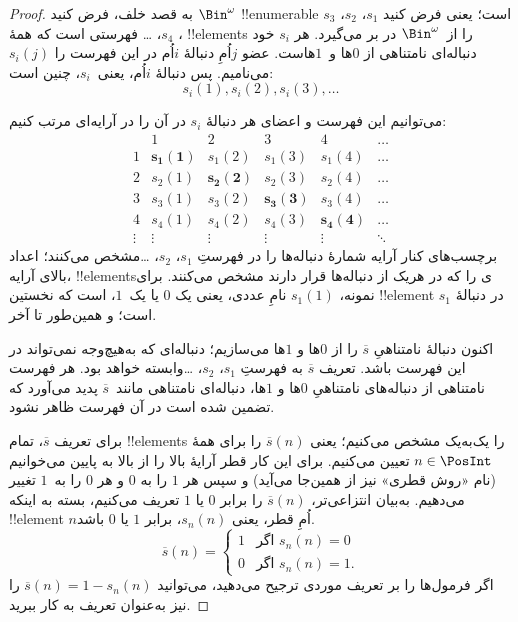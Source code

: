 \documentclass[../../../include/open-logic-section]{subfiles}
\begin{document}
\begin{proof}
به قصد خلف، فرض کنید $\Bin^\omega$ !!{enumerable} است؛ یعنی فرض کنید
$s_{1}$، $s_{2}$، $s_{3}$، $s_{4}$، \dots{} فهرستی است که همهٔ
!!{element}s را از~$\Bin^\omega$ در بر می‌گیرد. هر $s_i$ خود دنباله‌ای
نامتناهی از $0$ها و~$1$هاست. عضو $j$اُمِ دنبالهٔ $i$اُم در این فهرست
را $s_i(j)$ می‌نامیم. پس دنبالهٔ $i$اُم، یعنی~$s_i$، چنین است:
\[
s_i(1), s_i(2), s_i(3), \dots
\]

می‌توانیم این فهرست و اعضای هر دنبالهٔ $s_i$ در آن را در آرایه‌ای
مرتب کنیم:
\[
\begin{array}{c|c|c|c|c|c}
& 1 & 2 & 3 & 4 & \dots \\\hline
1 & \mathbf{s_{1}(1)} & s_{1}(2) & s_{1}(3) & s_1(4) & \dots \\\hline
2 & s_{2}(1)& \mathbf{s_{2}(2)} & s_2(3) & s_2(4) & \dots \\\hline
3 & s_{3}(1)& s_{3}(2) & \mathbf{s_3(3)} & s_3(4) & \dots \\\hline
4 & s_{4}(1)& s_{4}(2) & s_4(3) & \mathbf{s_4(4)} & \dots \\\hline
\vdots & \vdots & \vdots & \vdots & \vdots & \mathbf{\ddots}
\end{array}
\]
برچسب‌های کنار آرایه شمارهٔ دنباله‌ها را در فهرستِ $s_1$، $s_2$،
\dots مشخص می‌کنند؛ اعداد بالای آرایه، !!{element}sی را که در هریک از
دنباله‌ها قرار دارند مشخص می‌کنند. برای نمونه، $s_{1}(1)$ نامِ عددی،
یعنی یک $0$ یا یک~$1$، است که نخستین !!{element} در دنبالهٔ $s_{1}$
است؛ و همین‌طور تا آخر.

اکنون دنبالهٔ نامتناهیِ $\overline{s}$ را از $0$ها و $1$ها می‌سازیم؛
دنباله‌ای که به‌هیچ‌وجه نمی‌تواند در این فهرست باشد. تعریف
$\overline{s}$ به فهرستِ $s_1$، $s_2$، \dots وابسته خواهد بود. هر
فهرست نامتناهی از دنباله‌های نامتناهیِ $0$ها و $1$ها، دنباله‌ای
نامتناهی مانند~$\overline{s}$ پدید می‌آورد که تضمین شده است در آن
فهرست ظاهر نشود.

برای تعریف $\overline{s}$، تمام !!{element}s را یک‌به‌یک مشخص می‌کنیم؛
یعنی $\overline{s}(n)$ را برای همهٔ $n \in \PosInt$ تعیین می‌کنیم.
برای این کار قطر آرایهٔ بالا را از بالا به پایین می‌خوانیم (نام «روش
قطری» نیز از همین‌جا می‌آید) و سپس هر $1$ را به $0$ و هر $0$ را به~$1$
تغییر می‌دهیم. به‌بیان انتزاعی‌تر، $\overline{s}(n)$ را برابر $0$ یا
$1$ تعریف می‌کنیم، بسته به اینکه !!{element} $n$اُمِ قطر، یعنی
$s_n(n)$، برابر $1$ یا $0$ باشد.
\[
\overline{s}(n) =
\begin{cases}
1 & \text{اگر $s_{n}(n) = 0$}\\
0 & \text{اگر $s_{n}(n) = 1$}.
\end{cases}
\]
اگر فرمول‌ها را بر تعریف موردی ترجیح می‌دهید، می‌توانید
$\overline{s}(n) = 1 - s_n(n)$ را نیز به‌عنوان تعریف به کار ببرید.


\end{proof}
\end{document}
